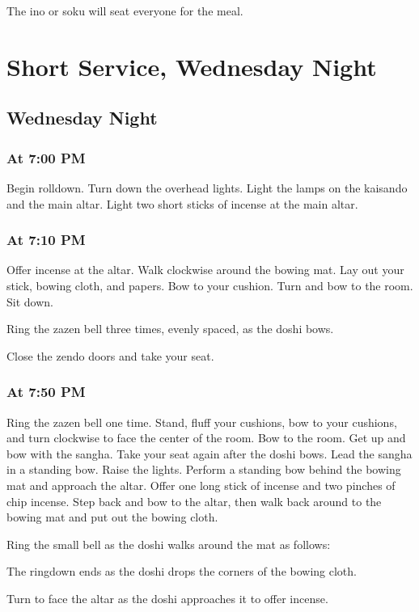 \documentclass{kdo}
\begin{document}
\begin{services}
The ino or soku will seat everyone for the meal.

\part{Short Service, Wednesday Night}
\chapter{Wednesday Night}
\section*{At 7:00 PM}
\tenken Begin rolldown.
\doan Turn down the overhead lights. Light the lamps on the kaisando and the
main altar. Light two short sticks of incense at the main altar.
\section*{At 7:10 PM}

\doshi Offer incense at the altar. Walk clockwise around the bowing mat. Lay
out your stick, bowing cloth, and papers. Bow to your cushion. Turn and bow to
the room.  Sit down.

\doan Ring the zazen bell three times, evenly spaced, as the doshi bows.
\jundoStartZazen

\tenken Close the zendo doors and take your seat.

\section*{At 7:50 PM}
\doan Ring the zazen bell one time. \bigspace\zazenbell
\sangha Stand, fluff your cushions, bow to your cushions, and turn clockwise to
face the center of the room. Bow to the room.
\doan Get up and bow with the sangha. Take your seat again after the doshi
bows.
\doshi Lead the sangha in a standing bow.
\tenken Raise the lights.
\doshi Perform a standing bow behind the bowing mat and approach the altar.
Offer one long stick of incense and two pinches of chip incense. Step back and
bow to the altar, then walk back around to the bowing mat and put out the
bowing cloth.

\doan Ring the small bell as the doshi walks around the mat as follows:

\doshiBowingClothRolldown

The ringdown ends as the doshi drops the corners of the bowing cloth.

\kokyo Turn to face the altar as the doshi approaches it to offer incense.


\end{services}
\end{document}
